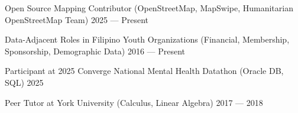 
Open Source Mapping Contributor (OpenStreetMap, MapSwipe, Humanitarian OpenStreetMap Team)	\hfill 2025 --- Present

Data-Adjacent Roles in Filipino Youth Organizations (Financial, Membership, Sponsorship, Demographic Data)	\hfill 2016 --- Present

Participant at 2025 Converge National Mental Health Datathon (Oracle DB, SQL)	\hfill 2025
 
Peer Tutor at York University (Calculus, Linear Algebra)	\hfill 2017 --- 2018
